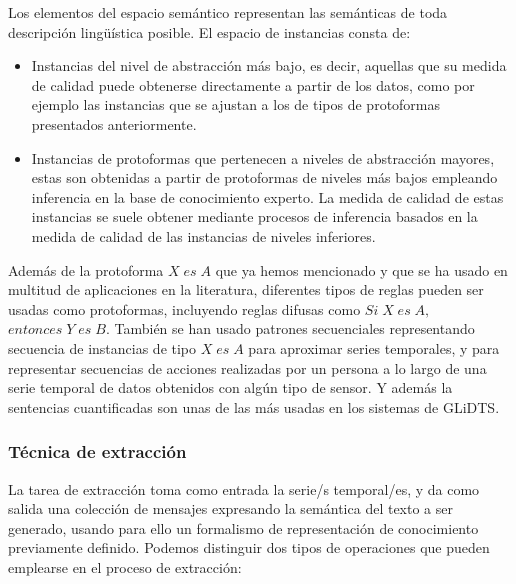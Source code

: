 \documentclass[10pt,a4paper]{article}
\begin{document}
Los elementos del espacio semántico representan las semánticas de toda descripción lingüística posible. El espacio de instancias consta de:

\begin{itemize}
\item Instancias del nivel de abstracción más bajo, es decir, aquellas que su medida de calidad puede obtenerse directamente a partir de los datos, como por ejemplo las instancias que se ajustan a los de tipos de protoformas presentados anteriormente.
\item Instancias de protoformas que pertenecen a niveles de abstracción mayores, estas son obtenidas a partir de protoformas de niveles más bajos empleando inferencia en la base de conocimiento experto. La medida de calidad de estas instancias se suele obtener mediante procesos de inferencia basados en la medida de calidad de las instancias de niveles inferiores.
\end{itemize}

Además de la protoforma $X \; es \; A$ que ya hemos mencionado y que se ha usado en multitud de aplicaciones en la literatura, diferentes tipos de reglas pueden ser usadas como protoformas, incluyendo reglas difusas como $Si \; X \; es \; A,$ $entonces \; Y \; es \; B$. También se han usado patrones secuenciales representando secuencia de instancias de tipo $X \; es \; A$ para aproximar series temporales, y para representar secuencias de acciones realizadas por un persona a lo largo de una serie temporal de datos obtenidos con algún tipo de sensor. Y además la sentencias cuantificadas son unas de las más usadas en los sistemas de GLiDTS.

\subsubsection{Técnica de extracción}

La tarea de extracción toma como entrada la serie/s temporal/es, y da como salida una colección de mensajes expresando la semántica del texto a ser generado, usando para ello un formalismo de representación de conocimiento previamente definido. Podemos distinguir dos tipos de operaciones que pueden emplearse en el proceso de extracción:
\end{document}
